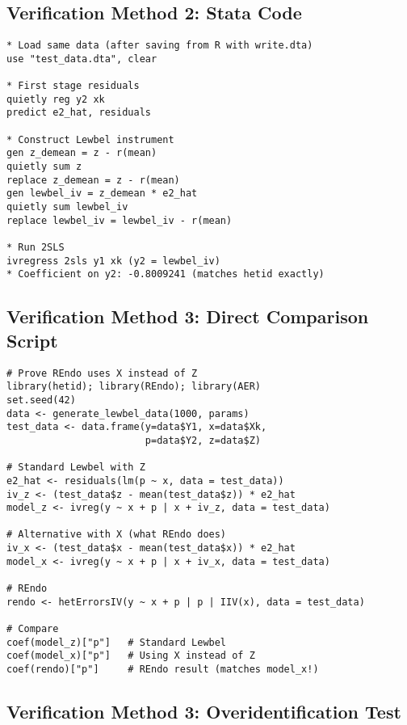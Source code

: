 \documentclass[12pt]{article}
\begin{document}
\subsection{Verification Method 2: Stata Code}

\begin{lstlisting}[caption={Stata code producing identical results}]
* Load same data (after saving from R with write.dta)
use "test_data.dta", clear

* First stage residuals
quietly reg y2 xk
predict e2_hat, residuals

* Construct Lewbel instrument
gen z_demean = z - r(mean)
quietly sum z
replace z_demean = z - r(mean)
gen lewbel_iv = z_demean * e2_hat
quietly sum lewbel_iv
replace lewbel_iv = lewbel_iv - r(mean)

* Run 2SLS
ivregress 2sls y1 xk (y2 = lewbel_iv)
* Coefficient on y2: -0.8009241 (matches hetid exactly)
\end{lstlisting}

\subsection{Verification Method 3: Direct Comparison Script}

\begin{lstlisting}[caption={Complete verification showing REndo uses X not Z}]
# Prove REndo uses X instead of Z
library(hetid); library(REndo); library(AER)
set.seed(42)
data <- generate_lewbel_data(1000, params)
test_data <- data.frame(y=data$Y1, x=data$Xk,
                        p=data$Y2, z=data$Z)

# Standard Lewbel with Z
e2_hat <- residuals(lm(p ~ x, data = test_data))
iv_z <- (test_data$z - mean(test_data$z)) * e2_hat
model_z <- ivreg(y ~ x + p | x + iv_z, data = test_data)

# Alternative with X (what REndo does)
iv_x <- (test_data$x - mean(test_data$x)) * e2_hat
model_x <- ivreg(y ~ x + p | x + iv_x, data = test_data)

# REndo
rendo <- hetErrorsIV(y ~ x + p | p | IIV(x), data = test_data)

# Compare
coef(model_z)["p"]   # Standard Lewbel
coef(model_x)["p"]   # Using X instead of Z
coef(rendo)["p"]     # REndo result (matches model_x!)
\end{lstlisting}

\subsection{Verification Method 3: Overidentification Test}
\end{document}
